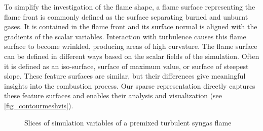 To simplify the investigation of the flame shape, a flame surface representing
the flame front is commonly defined as the surface separating burned and unburnt
gases. It is contained in the flame front and its surface normal is aligned with
the gradients of the scalar variables.
%
%
Interaction with turbulence causes this flame surface to become wrinkled,
producing areas of high curvature. The flame surface can be defined in different
ways based on the scalar fields of the simulation. Often it is defined as an
iso-surface, surface of maximum value, or surface of steepest slope. These
feature surfaces are similar, but their differences give meaningful insights
into the combustion process. Our sparse representation directly captures these
feature surfaces and enables their analysis and visualization (see
\autoref{fig_contourmeshvis}).

\begin{figure}[t]
    \setlength\figurewidth\textwidth
    \centering
    
    \caption{Slices of simulation variables of a premixed turbulent syngas flame}
    \label{fig:sim_vars}
\end{figure}


